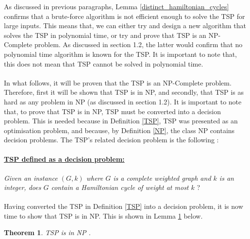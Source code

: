 \documentclass[12pt]{article}
\newtheorem{theorem}[definition]{Theorem}
\numberwithin{equation}{subsection}
\numberwithin{table}{subsection}
\begin{document}
As discussed in previous paragraphs, Lemma \ref{distinct_hamiltonian_cycles} confirms that a brute-force algorithm is not efficient enough to solve the TSP for large inputs. This means that, we can either try and design a new algorithm that solves the TSP in polynomial time, or try and prove that TSP is an NP-Complete problem. As discussed in section 1.2, the latter would confirm that no polynomial time algorithm is known for the TSP. It is important to note that, this does not mean that TSP cannot be solved in polynomial time.\\\\ In what follows, it will be proven that the TSP is an NP-Complete problem. Therefore, first it will be shown that TSP is in NP, and secondly, that TSP is as hard as any problem in NP (as discussed in section 1.2). It is important to note that, to prove that TSP is in NP, TSP must be converted into a decision problem. This is needed because in Definition \ref{TSP}, TSP was presented as an optimisation problem, and because, by Definition \ref{NP}, the class NP contains decision problems. The TSP's related decision problem is the following :\\\\
\underline{\textbf{TSP defined as a decision problem:}}\\\\
\textit{Given an instance $(G,k)$ where $G$ is a complete weighted graph and $k$ is an integer, does $G$ contain a Hamiltonian cycle of weight at most $k$} \cite{cormen_leiserson_rivest_stein}?\\\\
Having converted the TSP in Definition \ref{TSP} into a decision problem, it is now time to show that TSP is in NP. This is shown in Lemma \ref{TSP_in_NP} below.
\begin{theorem}
\label{TSP_in_NP}
TSP is in NP {}.
\end{theorem}
\end{document}
